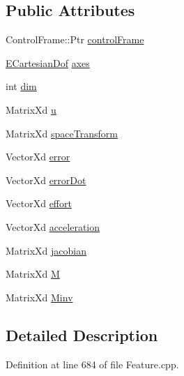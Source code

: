 \subsection*{Public Attributes}
\begin{DoxyCompactItemize}
\item 
Control\+Frame\+::\+Ptr \hyperlink{structocra_1_1DisplacementFeature_1_1Pimpl_a7bf1e93fdc7fe08d51a844161f565223}{control\+Frame}
\item 
\hyperlink{namespaceocra_a436781c7059a0f76027df1c652126260}{E\+Cartesian\+Dof} \hyperlink{structocra_1_1DisplacementFeature_1_1Pimpl_a8c3adba9fb891dac9c158ceb4fad62ea}{axes}
\item 
int \hyperlink{structocra_1_1DisplacementFeature_1_1Pimpl_a1d9edf50ee4d19d01b71ae2e871519b6}{dim}
\item 
Matrix\+Xd \hyperlink{structocra_1_1DisplacementFeature_1_1Pimpl_a7ee31c021de6d56a80cfe6bebac34af1}{u}
\item 
Matrix\+Xd \hyperlink{structocra_1_1DisplacementFeature_1_1Pimpl_ae4f3165c1ca46e3d14cb9fdeab2297a0}{space\+Transform}
\item 
Vector\+Xd \hyperlink{structocra_1_1DisplacementFeature_1_1Pimpl_a98721661ee9190e726390f6049ffdf1b}{error}
\item 
Vector\+Xd \hyperlink{structocra_1_1DisplacementFeature_1_1Pimpl_ad5d72a6e8baf66f182ff8ec61a74530a}{error\+Dot}
\item 
Vector\+Xd \hyperlink{structocra_1_1DisplacementFeature_1_1Pimpl_a9df9dfcb9f2d59c1f09bd676c3589e7b}{effort}
\item 
Vector\+Xd \hyperlink{structocra_1_1DisplacementFeature_1_1Pimpl_a1495e4c5c743c4c82a7948a9c6911e31}{acceleration}
\item 
Matrix\+Xd \hyperlink{structocra_1_1DisplacementFeature_1_1Pimpl_a1dd31262d5e3fcec9850a03324754a8f}{jacobian}
\item 
Matrix\+Xd \hyperlink{structocra_1_1DisplacementFeature_1_1Pimpl_ac656f6c1eb52377b1d313820f4a448d4}{M}
\item 
Matrix\+Xd \hyperlink{structocra_1_1DisplacementFeature_1_1Pimpl_a9fc763f2f433156e2df5a239a64e5514}{Minv}
\end{DoxyCompactItemize}


\subsection{Detailed Description}


Definition at line 684 of file Feature.\+cpp.



